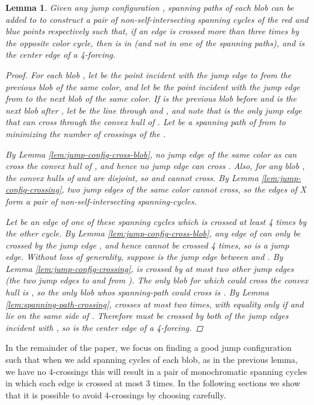 \documentclass[12pt]{article}
\newtheorem{lemma}{Lemma}
\theoremstyle{definition}
\begin{document}
\begin{lemma}
  \label{lem:complete-jump-config}
  Given any jump configuration ,
  spanning paths of each blob can be added to  to construct a pair of non-self-intersecting spanning cycles of the red and blue points respectively such that, if an edge  is crossed more than three times by the opposite color cycle, then  is in  (and not in one of the spanning paths), and  is the center edge of a 4-forcing.
  \begin{proof}
For each blob , let  be the point incident with the jump edge to  from the previous blob of the same color, and let  be the point incident with the jump edge from  to the next blob of the same color.
    If  is the previous blob before  and  is the next blob after , let  be the line through  and , and note that  is the only jump edge that can cross through the convex hull of .
    Let  be a spanning path of  from  to  minimizing the number of crossings of the .

    By Lemma \ref{lem:jump-config-cross-blob}, no jump edge of the same color as  can cross the convex hull of , and hence no jump edge can cross .
    Also, for any blob , the convex hulls of  and  are disjoint, so  and  cannot cross.
    By Lemma \ref{lem:jump-config-crossing}, two jump edges of the same color cannot cross, so the edges of  X form a pair of non-self-intersecting spanning-cycles.

    Let  be an edge of one of these spanning cycles which is crossed at least 4 times by the other cycle.
    By Lemma \ref{lem:jump-config-cross-blob}, any edge of  can only be crossed by the jump edge , and hence cannot be crossed 4 times, so  is a jump edge.
    Without loss of generality, suppose  is the jump edge between  and .
    By Lemma \ref{lem:jump-config-crossing},  is crossed by at most two other jump edges (the two jump edges to and from ).
    The only blob for which  could cross the convex hull is , so the only blob whos spanning-path  could cross is .
    By Lemma \ref{lem:spanning-path-crossing},  crosses  at most two times, with equality only if  and  lie on the same side of .
    Therefore  must be crossed by both of the jump edges incident with , so  is the center edge of a 4-forcing.
  \end{proof}
\end{lemma}

In the remainder of the paper, we focus on finding a good jump configuration such that when we add spanning cycles of each blob, as in the previous lemma, we have no 4-crossings \textemdash this will result in a pair of monochromatic spanning cycles in which each edge is crossed at most 3 times. In the following sections we show that it is possible to avoid 4-crossings by choosing  carefully.
\end{document}
